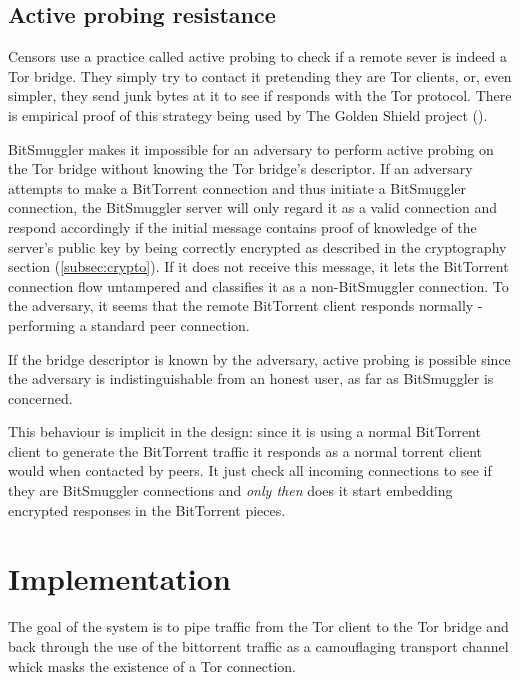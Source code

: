 \documentclass[11pt]{article} %
\newcommand{\projectName}{BitSmuggler }
\begin{document}
\label{subsec:steganography}


\subsection{Active probing resistance}
\label{subsec:activeProbingResist}

Censors use a practice called active probing to check if  a remote sever is indeed a Tor bridge. They simply try to contact it pretending they are Tor clients, or, even simpler, they send junk bytes at it to see if responds with the Tor protocol. There is empirical proof of this strategy being used by The Golden Shield project (\citep*{web:bridgeKnock}).

\projectName makes it impossible for an adversary to perform active probing on the Tor bridge without knowing the Tor bridge's descriptor. If an adversary attempts to make a BitTorrent connection and thus initiate a \projectName connection, the \projectName server will only regard it as a valid connection and respond accordingly if the initial message contains proof of knowledge of the server's public key by being correctly encrypted as described in the cryptography section (\ref{subsec:crypto}).  If it does not receive this message, it lets the BitTorrent connection flow untampered and classifies it as a non-\projectName connection. To the adversary, it seems that the remote BitTorrent client responds normally - performing a standard peer connection. 

If the bridge descriptor is known by the adversary, active probing is possible since the adversary is indistinguishable from an honest user, as far as BitSmuggler is concerned.

This behaviour is implicit in the design: since it is using a normal BitTorrent client to generate the BitTorrent traffic it responds as a normal torrent client would when contacted by peers. It just check all incoming connections to see if they are \projectName connections and \textit{only then} does it start embedding encrypted responses in the BitTorrent pieces.


\section{Implementation}

The goal of the system is to pipe traffic from the Tor client to the Tor bridge and back through the use of the bittorrent traffic as a camouflaging transport channel whick masks the existence of a Tor connection.
\end{document}
